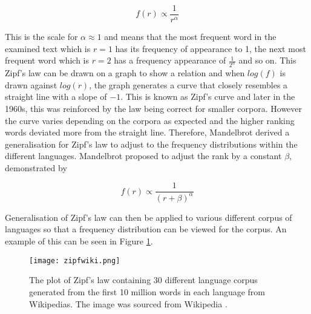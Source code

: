 \begin{equation}\label{eq:zipfs}
f(r) \propto \frac{1}{r^{\alpha}}
\end{equation}

This is the scale for $\alpha \approx 1$ and means that the most frequent word in the examined text which is $r = 1$ has its frequency of appearance to 1, the next most frequent word which is $r = 2$ has a frequency appearance of $\frac{1}{2^{\alpha}}$ and so on. This Zipf's law can be drawn on a graph to show a relation and when $log(f)$ is drawn against $log(r)$, the graph generates a curve that closely resembles a straight line with a slope of $-1$. This is known as Zipf's curve and later in the 1960s, this was reinforced by the law being correct for smaller corpora\cite{sicilia2002extension}. However the curve varies depending on the corpora as expected and the higher ranking words deviated more from the straight line. Therefore, Mandelbrot derived a generalisation for Zipf's law to adjust to the frequency distributions within the different languages. Mandelbrot proposed to adjust the rank by a constant $\beta$, demonstrated by

\begin{equation}\label{eq:zipfs}
f(r) \propto \frac{1}{(r + \beta)^{\alpha}}
\end{equation}

Generalisation of Zipf's law can then be applied to various different corpus of languages so that a frequency distribution can be viewed for the corpus. An example of this can be seen in Figure \ref{fig:zipfwiki}.

\begin{figure}[!htb]
	\centering
	\texttt{[image: zipfwiki.png]}
	\caption{The plot of Zipf's law containing 30 different language corpus generated from the first 10 million words in each language from Wikipedias. The image was sourced from Wikipedia \cite{zipffigure}. }
	\label{fig:zipfwiki}
\end{figure}

